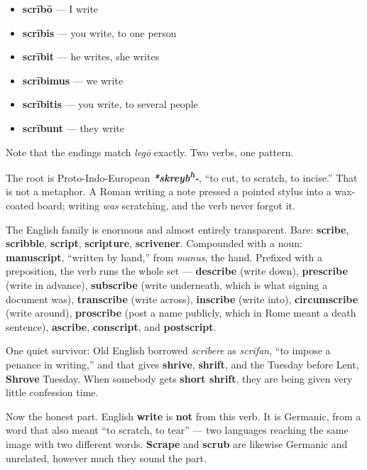 \begin{itemize}
\raggedright
  \item \textbf{scrībō} — I write
  \item \textbf{scrībis} — you write, to one person
  \item \textbf{scrībit} — he writes, she writes
  \item \textbf{scrībimus} — we write
  \item \textbf{scrībitis} — you write, to several people
  \item \textbf{scrībunt} — they write
\end{itemize}

Note that the endings match \emph{legō} exactly. Two verbs, one pattern.

\begin{cousinweb}
The root is Proto-Indo-European \emph{\textbf{*skreyb\textsuperscript{h}-}}, \textquotedblleft{}to cut, to scratch, to incise.\textquotedblright{} That is not a metaphor. A Roman writing a note pressed a pointed stylus into a wax-coated board; writing \emph{was} scratching, and the verb never forgot it.

The English family is enormous and almost entirely transparent. Bare: \textbf{scribe}, \textbf{scribble}, \textbf{script}, \textbf{scripture}, \textbf{scrivener}. Compounded with a noun: \textbf{manuscript}, \textquotedblleft{}written by hand,\textquotedblright{} from \emph{manus}, the hand. Prefixed with a preposition, the verb runs the whole set — \textbf{describe} (write down), \textbf{prescribe} (write in advance), \textbf{subscribe} (write underneath, which is what signing a document was), \textbf{transcribe} (write across), \textbf{inscribe} (write into), \textbf{circumscribe} (write around), \textbf{proscribe} (post a name publicly, which in Rome meant a death sentence), \textbf{ascribe}, \textbf{conscript}, and \textbf{postscript}.

One quiet survivor: Old English borrowed \emph{scrībere} as \emph{scrīfan}, \textquotedblleft{}to impose a penance in writing,\textquotedblright{} and that gives \textbf{shrive}, \textbf{shrift}, and the Tuesday before Lent, \textbf{Shrove} Tuesday. When somebody gets \textbf{short shrift}, they are being given very little confession time.

Now the honest part. English \textbf{write} is \textbf{not} from this verb. It is Germanic, from a word that also meant \textquotedblleft{}to scratch, to tear\textquotedblright{} — two languages reaching the same image with two different words. \textbf{Scrape} and \textbf{scrub} are likewise Germanic and unrelated, however much they sound the part.
\end{cousinweb}

